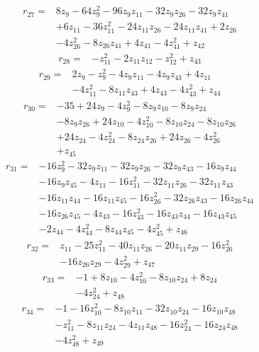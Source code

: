 \begin{align*}
r_{27}={}&8z_{9} -64z_{9}^{2} -96z_{9}z_{11} -32z_{9}z_{26} -32z_{9}z_{41}\\
&+6z_{11} -36z_{11}^{2} -24z_{11}z_{26} -24z_{11}z_{41} +2z_{26}\\
&-4z_{26}^{2} -8z_{26}z_{41} +4z_{41} -4z_{41}^{2} +z_{42}
\end{align*}
\begin{align*}
r_{28}={}&-z_{11}^{2} -2z_{11}z_{12} -z_{12}^{2} +z_{43}
\end{align*}
\begin{align*}
r_{29}={}&2z_{9} -z_{9}^{2} -4z_{9}z_{11} -4z_{9}z_{43} +4z_{11}\\
&-4z_{11}^{2} -8z_{11}z_{43} +4z_{43} -4z_{43}^{2} +z_{44}
\end{align*}
\begin{align*}
r_{30}={}&-35 +24z_{9} -4z_{9}^{2} -8z_{9}z_{10} -8z_{9}z_{24}\\
&-8z_{9}z_{26} +24z_{10} -4z_{10}^{2} -8z_{10}z_{24} -8z_{10}z_{26}\\
&+24z_{24} -4z_{24}^{2} -8z_{24}z_{26} +24z_{26} -4z_{26}^{2}\\
&+z_{45}
\end{align*}
\begin{align*}
r_{31}={}&-16z_{9}^{2} -32z_{9}z_{11} -32z_{9}z_{26} -32z_{9}z_{43} -16z_{9}z_{44}\\
&-16z_{9}z_{45} -4z_{11} -16z_{11}^{2} -32z_{11}z_{26} -32z_{11}z_{43}\\
&-16z_{11}z_{44} -16z_{11}z_{45} -16z_{26}^{2} -32z_{26}z_{43} -16z_{26}z_{44}\\
&-16z_{26}z_{45} -4z_{43} -16z_{43}^{2} -16z_{43}z_{44} -16z_{43}z_{45}\\
&-2z_{44} -4z_{44}^{2} -8z_{44}z_{45} -4z_{45}^{2} +z_{46}
\end{align*}
\begin{align*}
r_{32}={}&z_{11} -25z_{11}^{2} -40z_{11}z_{26} -20z_{11}z_{29} -16z_{26}^{2}\\
&-16z_{26}z_{29} -4z_{29}^{2} +z_{47}
\end{align*}
\begin{align*}
r_{33}={}&-1 +8z_{10} -4z_{10}^{2} -8z_{10}z_{24} +8z_{24}\\
&-4z_{24}^{2} +z_{48}
\end{align*}
\begin{align*}
r_{34}={}&-1 -16z_{10}^{2} -8z_{10}z_{11} -32z_{10}z_{24} -16z_{10}z_{48}\\
&-z_{11}^{2} -8z_{11}z_{24} -4z_{11}z_{48} -16z_{24}^{2} -16z_{24}z_{48}\\
&-4z_{48}^{2} +z_{49}
\end{align*}
